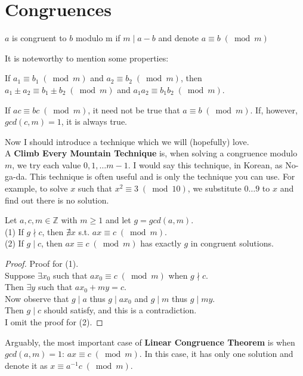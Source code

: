 \section{Congruences}

\begin{definition}
  $a$ is congruent to $b$ modulo m if $m\mid a - b$ and denote $a\equiv b\; (\bmod{m})$
\end{definition}

\noindent
It is noteworthy to mention some properties:

\begin{observation}
  If $a_{1}\equiv b_{1}\; (\bmod{m})$ and $a_{2}\equiv b_{2}\; (\bmod{m})$, then $a_{1} \pm a_{2}\equiv b_{1}\pm b_{2}\; (\bmod{m})$ and $a_{1}a_{2}\equiv b_{1}b_{2}\; (\bmod{m})$.
\end{observation}

\begin{observation}
  If $ac\equiv bc\; (\bmod{m})$, it need not be true that $a\equiv b\; (\bmod{m})$. If, however, $gcd(c, m) = 1$, it is always true. 
\end{observation}

\noindent
Now I should introduce a technique which we will (hopefully) love. \\
A \textbf{Climb Every Mountain Technique} is, when solving a congruence modulo $m$, we try each value $0, 1, \dots m - 1$. I would say this technique, in Korean, as No-ga-da. This technique is often useful and is only the technique you can use. For example, to solve $x$ such that $x^{2}\equiv 3\; (\bmod{10})$, we substitute $0\dots 9$ to $x$ and find out there is no solution.

\begin{theorem}
  Let $a, c, m\in \mathbb{Z}$ with $m\geq 1$ and let $g = gcd(a, m)$. \\
  (1) If $g\nmid c$, then $\nexists{x}$ s.t. $ax\equiv c\; (\bmod{m})$. \\
  (2) If $g\mid c$, then $ax\equiv c\; (\bmod{m})$ has exactly $g$ in congruent solutions.
\end{theorem}

\begin{proof}
Proof for (1). \\
Suppose $\exists{x_{0}}$ such that $ax_{0}\equiv c\; (\bmod{m})$ when $g\nmid c$. \\
Then $\exists{y}$ such that $ax_{0} + my = c$. \\
Now observe that $g\mid a$ thus $g\mid ax_{0}$ and $g\mid m$ thus $g\mid my$. \\
Then $g\mid c$ should satisfy, and this is a contradiction. \\
I omit the proof for (2).
\end{proof}

Arguably, the most important case of \textbf{Linear Congruence Theorem} is when $gcd(a, m) = 1$: $ax\equiv c\; (\bmod{m})$. In this case, it has only one solution and denote it as $x\equiv a^{-1}c\; (\bmod{m})$.